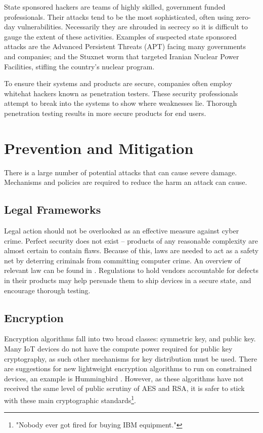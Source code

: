 \documentclass[10pt,journal,compsoc]{IEEEtran}
\begin{document}
State sponsored hackers are teams of highly skilled, government funded
professionals. Their attacks tend to be the most sophisticated, often using
zero-day vulnerabilities. Necessarily they are shrouded in secrecy so it is
difficult to gauge the extent of these activities. Examples of suspected state
sponsored attacks are the Advanced Persistent Threats (APT) facing many
governments and companies; and the Stuxnet worm that targeted Iranian Nuclear
Power Facilities, stifling the country's nuclear program.  

To ensure their systems and products are secure, companies often employ
whitehat hackers known as penetration testers. These security professionals
attempt to break into the systems to show where weaknesses lie. Thorough
penetration testing results in more secure products for end users.

\section{Prevention and Mitigation} 
There is a large number of potential attacks that can cause severe damage.
Mechanisms and policies are required to reduce the harm an attack can cause. 

\subsection{Legal Frameworks}
Legal action should not be overlooked as an effective measure against cyber
crime. Perfect security does not exist \cite{ThereMustBeA} -- products of any
reasonable complexity are almost certain to contain flaws. Because of this,
laws are needed to act as a safety net by deterring criminals from committing
computer crime. An overview of relevant law can be found in \cite{Weber2010}.
Regulations to hold vendors accountable for defects in their products may help
persuade them to ship devices in a secure state, and encourage thorough
testing. 

\subsection{Encryption}
Encryption algorithms fall into two broad classes: symmetric key, and public
key. Many IoT devices do not have the compute power required for public key
cryptography, as such other mechanisms for key distribution must be used.
There are  suggestions for new lightweight encryption algorithms to run on
constrained devices, an example is Hummingbird \cite{Sion2010}.  However, as
these algorithms have not received the same level of public scrutiny of AES and
RSA, it is safer to stick with these main cryptographic
standards\footnote{"Nobody ever got fired for buying IBM equipment."}. 
\end{document}
